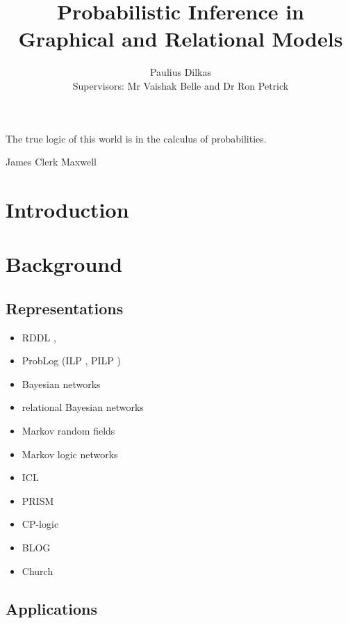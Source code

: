 \documentclass{article}
\title{Probabilistic Inference in Graphical and Relational Models}
\author{Paulius Dilkas \\[1ex] {\small Supervisors: Mr Vaishak Belle and Dr Ron
    Petrick}}
\affil{School of Informatics, University of Edinburgh}
\begin{document}
\maketitle

\epigraph{The true logic of this world is in the calculus of
  probabilities.}{James Clerk Maxwell}

\section{Introduction}

\section{Background} %

\subsection{Representations}

\begin{itemize}
\item RDDL \cite{sanner2010relational},
\item ProbLog \cite{DBLP:conf/ijcai/RaedtKT07} (ILP
  \cite{DBLP:journals/ngc/Muggleton91}, PILP \cite{DBLP:conf/ilp/2008p})
\item Bayesian networks \cite{DBLP:books/daglib/0066829}
\item relational Bayesian networks \cite{DBLP:conf/uai/Jaeger97}
\item Markov random fields \cite{spitzer1971markov}
\item Markov logic networks \cite{DBLP:journals/ml/RichardsonD06}
\item ICL \cite{DBLP:journals/ai/Poole97}
\item PRISM \cite{DBLP:conf/ijcai/SatoK97}
\item CP-logic \cite{DBLP:journals/tplp/VennekensDB09}
\item BLOG \cite{DBLP:conf/ijcai/MilchMRSOK05}
\item Church \cite{DBLP:conf/uai/GoodmanMRBT08}
\end{itemize}

\subsection{Applications}
\end{document}
